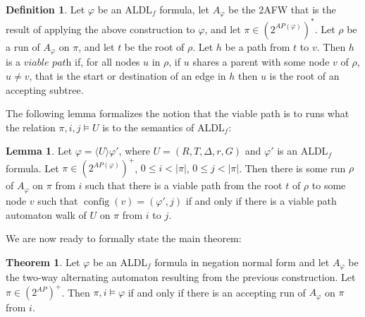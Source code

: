 \documentclass{lmcs}
\theoremstyle{definition}
\newtheorem{theorem}[thm]{Theorem}
\newtheorem{lemma}[thm]{Lemma}
\newtheorem{definition}[thm]{Definition}
\newcommand{\dbox}[1]{\langle #1 \rangle}
\DeclareMathOperator{\config}{config}
\DeclareMathOperator{\?}{?}
\begin{document}
\begin{definition}\label{def:viable_path}
  Let $\varphi$ be an ALDL$_f$ formula, let $A_\varphi$ be the 2AFW that is the result of applying
  the above construction to $\varphi$, and let $\pi \in (2^{AP(\varphi)})^*$. Let $\rho$ be a run of
  $A_\varphi$ on $\pi$, and let $t$ be the root of $\rho$. Let $h$
  be a path from $t$ to $v$. Then $h$ is a $\textit{viable path}$ if, for all nodes $u$ in $\rho$,
  if $u$ shares a parent with some node $v$ of $\rho$, $u \neq v$, that is the start or destination of an edge in $h$ then $u$ is the
  root of an accepting subtree.
\end{definition}

The following lemma formalizes the notion that the viable path is to runs what the relation
$\pi,i,j \models U$ is to the semantics of ALDL$_f$:

\begin{lemma}\label{lem:vpath_iff_vwalk}
    Let $\varphi = \dbox{U}\varphi'$, where $U = (R,T,\Delta,r,G)$ and $\varphi'$ is
    an ALDL$_f$ formula. Let $\pi \in (2^{AP(\varphi)})^+$, $0 \leq i < |\pi|$, $0 \leq j < |\pi|$.
    Then there is some run $\rho$ of $A_{\varphi}$ on $\pi$ from $i$ such that there is a viable path
    from the root $t$ of $\rho$ to some node $v$ such that $\config(v) = (\varphi',j)$ if and only if
    there is a viable path automaton walk of $U$ on $\pi$ from $i$ to $j$.
\end{lemma}

We are now ready to formally state the main theorem:

\begin{theorem}\label{thm:aldlf_2afw_equiv}
  Let $\varphi$
  be an ALDL$_f$ formula in negation normal form and let $A_\varphi$ be the two-way alternating
  automaton resulting from the previous construction. Let $\pi \in (2^{AP})^+$. Then $\pi,i
  \models \varphi$ if and only if there is an accepting run of $A_\varphi$ on $\pi$ from $i$. 
\end{theorem}
\end{document}
